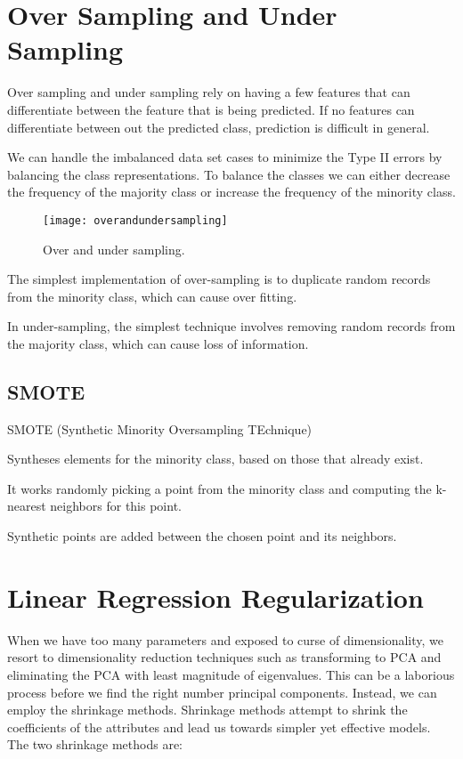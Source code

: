 	\section{Over Sampling and Under Sampling}
Over sampling and under sampling rely on having a few features that can differentiate between the feature that is being predicted.  If no features can differentiate between out the predicted class, prediction is difficult in general.

We can handle the imbalanced data set cases to minimize the Type II errors by balancing the class representations.  To balance the classes we can either decrease the frequency of the majority class or increase the frequency of the minority class.
	\begin{figure}[h]
		\centering
		\texttt{[image: overandundersampling]}
		\caption{Over and under sampling.}
		\label{fig:overandundersampling}
	\end{figure}

The simplest implementation of over-sampling is to duplicate random records from the minority class, which can cause over fitting.

In under-sampling, the simplest technique involves removing random records from the majority class, which can cause loss of information.

	\subsection{SMOTE}
SMOTE (Synthetic Minority Oversampling TEchnique)
	\begin{bulletedlist}
		\item Syntheses elements for the minority class, based on those that already exist.
		\item It works randomly picking a point from the minority class and computing the k-nearest neighbors for this point.
		\item Synthetic points are added between the chosen point and its neighbors.
	\end{bulletedlist}


	\section{Linear Regression Regularization}

When we have too many parameters and exposed to curse of dimensionality, we resort to dimensionality reduction techniques such as transforming to PCA and eliminating the PCA with least magnitude of eigenvalues. This can be a laborious process before we find the right number principal components. Instead, we can employ the shrinkage methods.  Shrinkage methods attempt to shrink the coefficients of the attributes and lead us towards simpler yet effective models. The two shrinkage methods are:

